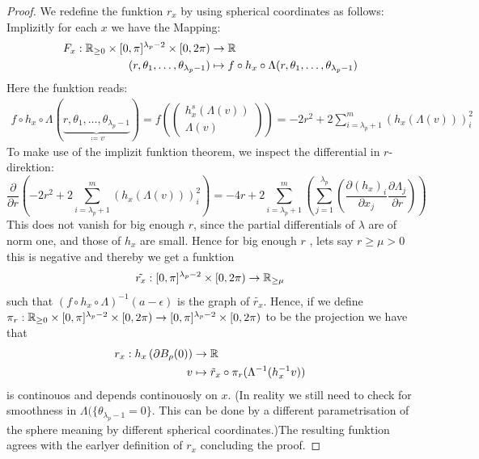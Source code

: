 \begin{proof}
	We redefine the funktion $r_x$  by using spherical coordinates as follows: Implizitly for each $x$ we have the Mapping: 
	\begin{align*}
		F_x:\mathbb{R}_{\geq 0}\times [0,\pi]^{\lambda_{p}-2}\times [0,2\pi) &\to \mathbb{R}\\
		(r,\theta_1,\dots, \theta_{\lambda_p-1})&\mapsto f\circ h_x\circ \Lambda(r,\theta_1,\dots, \theta_{\lambda_p-1})
	\end{align*}
	Here the funktion reads:
	\begin{align*}
		f\circ h_x\circ \Lambda(\underbrace{r,\theta_1,\dots, \theta_{\lambda_p-1}}_{\coloneq v})
		= f(
		\begin{pmatrix}
			h_x^s(\Lambda(v)) \\
			\Lambda (v)
		\end{pmatrix})
		= -2r^2 +2\sum_{i=\lambda_p+1}^{m} \left(h_x(\Lambda(v)) \right)_i^2
	\end{align*} To make use of the implizit funktion theorem, we inspect the differential in $r$-direktion:
	\begin{equation*}
		\frac{\partial}{\partial r}(-2r^2 +2\sum_{i=\lambda_p+1}^{m} \left(h_x(\Lambda(v)) \right)_i^2)=-4r+2\sum_{i=\lambda_p+1}^m\left(\sum_{j=1}^{\lambda_p}\left(
		\frac{\partial (h_x)_i}{\partial x_j}\frac{\partial \Lambda_j}{\partial r}
		\right)\right)
	\end{equation*} This does not vanish for big enough $r$, since the partial differentials of $\lambda$ are of norm one, and those of $h_x$ are small. Hence for big enough $r$ , lets say $r\geq \mu>0$ this is negative and thereby we get a funktion 
	\begin{align*}
		\tilde{r_x}: [0,\pi]^{\lambda_{p}-2}\times [0,2\pi)  \to \mathbb{R}_{\geq \mu}
	\end{align*} such that $(f\circ h_x\circ \Lambda)^{-1}(a-\epsilon) $ is the graph of $\tilde{r_x}$. Hence, if we define $\pi_r: \mathbb{R}_{\geq 0}\times [0,\pi]^{\lambda_{p}-2}\times [0,2\pi) \to [0,\pi]^{\lambda_{p}-2}\times [0,2\pi)$ to be the projection we have that
	\begin{align*}
		r_x: h_x\left(\partial B_{\rho}(0) \right)&\to \mathbb{R}\\
		v&\mapsto \tilde{r}_x\circ \pi_r(\Lambda^{-1}(h_x^{-1} v))
	\end{align*} is continouos and depends continouosly on $x$. (In reality we still need to check for smoothness in $\Lambda(\{\theta_{\lambda_{p}-1}=0\}$. This can be done by a different parametrisation of the sphere meaning by different spherical coordinates.)The resulting funktion agrees with the earlyer definition of $r_x$ concluding the proof. 
\end{proof}




